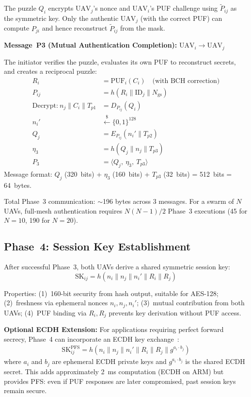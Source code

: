 \documentclass[11pt,a4paper]{article}
\begin{document}
The puzzle $Q_i$ encrypts $\text{UAV}_j$'s nonce and $\text{UAV}_i$'s PUF challenge using $\tilde{P}_{ij}$ as the symmetric key. Only the authentic $\text{UAV}_j$ (with the correct PUF) can compute $P_{ji}$ and hence reconstruct $\tilde{P}_{ij}$ from the mask.

\textbf{Message~P3 (Mutual Authentication Completion):} $\text{UAV}_i \rightarrow \text{UAV}_j$

The initiator verifies the puzzle, evaluates its own PUF to reconstruct secrets, and creates a reciprocal puzzle:
\begin{align}
R_i &= \text{PUF}_i(C_i) \quad \text{(with BCH correction)} \\
P_{ij} &= h(R_i \| \text{ID}_j \| N_{\text{gs}}) \\
\text{Decrypt:}\ n_j \| C_i \| T_{p1} &= D_{P_{ij}}(Q_i) \\
n_i' &\xleftarrow{\$} \{0,1\}^{128} \\
Q_j &= E_{P_{ij}}(n_i' \| T_{p2}) \\
\eta_3 &= h(Q_j \| n_j \| T_{p3}) \\
P_3 &= \langle Q_j,\ \eta_3,\ T_{p3} \rangle
\end{align}
Message format: $Q_j$ (320~bits) + $\eta_3$ (160~bits) + $T_{p3}$ (32~bits) = 512~bits = 64~bytes.

Total Phase~3 communication: $\sim$196 bytes across 3 messages. For a swarm of $N$ UAVs, full-mesh authentication requires $N(N-1)/2$ Phase~3 executions (45 for $N = 10$, 190 for $N = 20$).

\subsection{Phase~4: Session Key Establishment}

After successful Phase~3, both UAVs derive a shared symmetric session key:
\begin{equation}
\text{SK}_{ij} = h(n_i \| n_j \| n_i' \| R_i \| R_j)
\label{eq:session_key}
\end{equation}

Properties: (1)~160-bit security from hash output, suitable for AES-128; (2)~freshness via ephemeral nonces $n_i, n_j, n_i'$; (3)~mutual contribution from both UAVs; (4)~PUF binding via $R_i, R_j$ prevents key derivation without PUF access.

\textbf{Optional ECDH Extension:} For applications requiring perfect forward secrecy, Phase~4 can incorporate an ECDH key exchange~\cite{puf_key_exchange}:
\begin{align}
\text{SK}_{ij}^{\text{PFS}} = h(n_i \| n_j \| n_i' \| R_i \| R_j \| g^{a_i \cdot b_j})
\end{align}
where $a_i$ and $b_j$ are ephemeral ECDH private keys and $g^{a_i \cdot b_j}$ is the shared ECDH secret. This adds approximately 2~ms computation (ECDH on ARM) but provides PFS: even if PUF responses are later compromised, past session keys remain secure.
\end{document}

